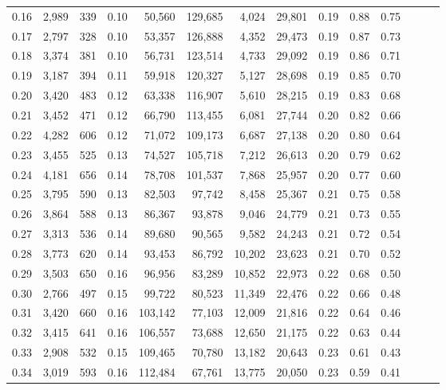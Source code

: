 \begin{tabular}{rrrrrrrrrrrrrr}
0.16 &  2,989 &  339 &  0.10 &   50,560 &  129,685 &   4,024 &  29,801 &  0.19 &  0.88 &      0.75 \\
0.17 &  2,797 &  328 &  0.10 &   53,357 &  126,888 &   4,352 &  29,473 &  0.19 &  0.87 &      0.73 \\
0.18 &  3,374 &  381 &  0.10 &   56,731 &  123,514 &   4,733 &  29,092 &  0.19 &  0.86 &      0.71 \\
0.19 &  3,187 &  394 &  0.11 &   59,918 &  120,327 &   5,127 &  28,698 &  0.19 &  0.85 &      0.70 \\
0.20 &  3,420 &  483 &  0.12 &   63,338 &  116,907 &   5,610 &  28,215 &  0.19 &  0.83 &      0.68 \\
0.21 &  3,452 &  471 &  0.12 &   66,790 &  113,455 &   6,081 &  27,744 &  0.20 &  0.82 &      0.66 \\
0.22 &  4,282 &  606 &  0.12 &   71,072 &  109,173 &   6,687 &  27,138 &  0.20 &  0.80 &      0.64 \\
0.23 &  3,455 &  525 &  0.13 &   74,527 &  105,718 &   7,212 &  26,613 &  0.20 &  0.79 &      0.62 \\
0.24 &  4,181 &  656 &  0.14 &   78,708 &  101,537 &   7,868 &  25,957 &  0.20 &  0.77 &      0.60 \\
0.25 &  3,795 &  590 &  0.13 &   82,503 &   97,742 &   8,458 &  25,367 &  0.21 &  0.75 &      0.58 \\
0.26 &  3,864 &  588 &  0.13 &   86,367 &   93,878 &   9,046 &  24,779 &  0.21 &  0.73 &      0.55 \\
0.27 &  3,313 &  536 &  0.14 &   89,680 &   90,565 &   9,582 &  24,243 &  0.21 &  0.72 &      0.54 \\
0.28 &  3,773 &  620 &  0.14 &   93,453 &   86,792 &  10,202 &  23,623 &  0.21 &  0.70 &      0.52 \\
0.29 &  3,503 &  650 &  0.16 &   96,956 &   83,289 &  10,852 &  22,973 &  0.22 &  0.68 &      0.50 \\
0.30 &  2,766 &  497 &  0.15 &   99,722 &   80,523 &  11,349 &  22,476 &  0.22 &  0.66 &      0.48 \\
0.31 &  3,420 &  660 &  0.16 &  103,142 &   77,103 &  12,009 &  21,816 &  0.22 &  0.64 &      0.46 \\
0.32 &  3,415 &  641 &  0.16 &  106,557 &   73,688 &  12,650 &  21,175 &  0.22 &  0.63 &      0.44 \\
0.33 &  2,908 &  532 &  0.15 &  109,465 &   70,780 &  13,182 &  20,643 &  0.23 &  0.61 &      0.43 \\
0.34 &  3,019 &  593 &  0.16 &  112,484 &   67,761 &  13,775 &  20,050 &  0.23 &  0.59 &      0.41 \\

\end{tabular}
